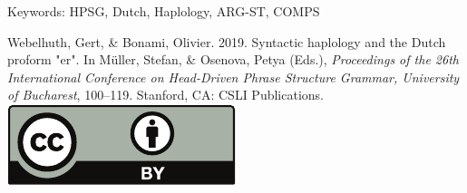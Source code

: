 \documentclass[11pt,a4paper,fleqn]{article}
\begin{document}
\noindent
Keywords: HPSG, Dutch, Haplology, ARG-ST, COMPS


\vfill
\noindent
Webelhuth, Gert, \& Bonami, Olivier. 2019. Syntactic haplology and the Dutch proform "er". In Müller, Stefan, \& Osenova, Petya (Eds.), \emph{{Proceedings of the 26th International Conference on Head-Driven Phrase Structure Grammar, University of Bucharest}}, 100--119. Stanford,
CA: CSLI Publications. \hfill\href{http://creativecommons.org/licenses/by/4.0/}{\includegraphics[height=.75em]{Includes/ccby-eps-converted-to.pdf}}

\newpage

\end{document}
